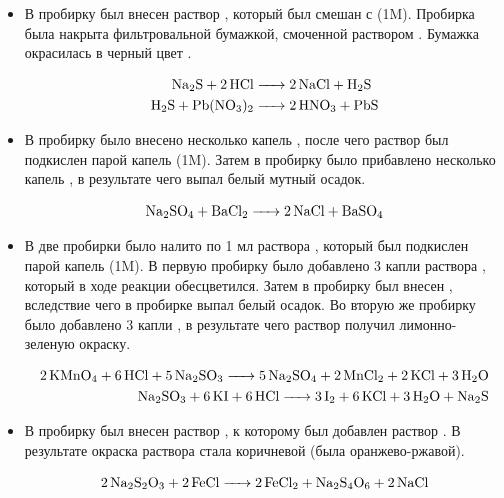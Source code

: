 \documentclass[a4paper, 12pt]{article}
\begin{document}
\begin{itemize}
\item 

В пробирку был внесен раствор , который был смешан с  (1M). Пробирка была накрыта фильтровальной бумажкой, смоченной раствором . Бумажка окрасилась в черный цвет .

\begin{align}
	\ce{Na2S + 2HCl &-> 2 NaCl + H2S}\\
	\ce{H2S + Pb(NO3)2 &-> 2 HNO3 + PbS}
\end{align}

\item

В пробирку было внесено несколько капель , после чего раствор был подкислен парой капель  (1M). Затем в пробирку было прибавлено несколько капель , в результате чего выпал белый мутный осадок.

\begin{equation}
	\ce{Na2SO4 + BaCl2 -> 2 NaCl + BaSO4}
\end{equation}

\item 

В две пробирки было налито по 1 мл раствора , который был подкислен парой капель  (1M). В первую пробирку было добавлено 3 капли раствора , который в ходе реакции обесцветился. Затем в пробирку был внесен , вследствие чего в пробирке выпал белый осадок. Во вторую же пробирку было добавлено 3 капли , в результате чего раствор получил лимонно-зеленую окраску. %


\begin{align}
	\ce{2 KMnO4 + 6 HCl + 5 Na2SO3 -> 5 Na2SO4 + 2MnCl2 + 2KCl + 3H2O}\\
	\ce{Na2SO3 + 6 KI + 6 HCl -> 3 I2 + 6 KCl + 3H2O + Na2S}
\end{align}

\item 

В пробирку был внесен раствор , к которому был добавлен раствор . В результате окраска раствора стала коричневой (была оранжево-ржавой).

\begin{equation}
	\ce{2 Na2S2O3 + 2FeCl -> 2 FeCl2 + Na2S4O6 + 2 NaCl}
\end{equation}
\end{itemize}
\end{document}

